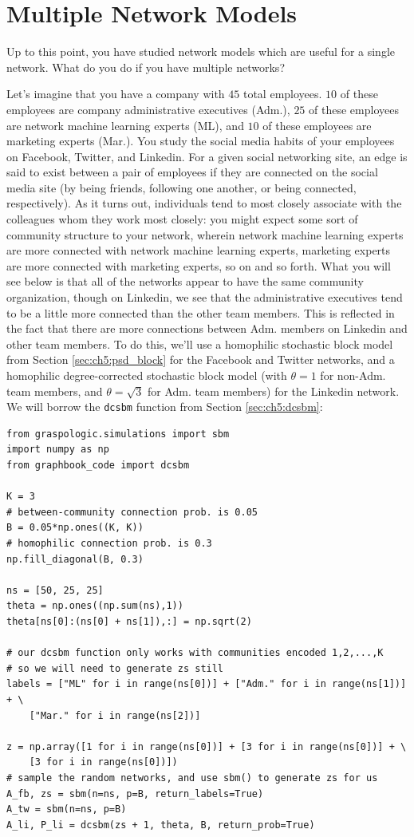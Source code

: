 \section{Multiple Network Models}
\label{sec:ch5:multi}


Up to this point, you have studied network models which are useful for a single network. What do you do if you have multiple networks?

Let's imagine that you have a company with $45$ total employees. $10$ of these employees are company administrative executives (Adm.), $25$ of these employees are network machine learning experts (ML), and $10$ of these employees are marketing experts (Mar.). You study the social media habits of your employees on Facebook, Twitter, and Linkedin. For a given social networking site, an edge is said to exist between a pair of employees if they are connected on the social media site (by being friends, following one another, or being connected, respectively). As it turns out, individuals tend to most closely associate with the colleagues whom they work most closely: you might expect some sort of community structure to your network, wherein network machine learning experts are more connected with network machine learning experts, marketing experts are more connected with marketing experts, so on and so forth. What you will see below is that all of the networks appear to have the same community organization, though on Linkedin, we see that the administrative executives tend to be a little more connected than the other team members. This is reflected in the fact that there are more connections between Adm. members on Linkedin and other team members. To do this, we'll use a homophilic stochastic block model from Section \ref{sec:ch5:psd_block} for the Facebook and Twitter networks, and a homophilic degree-corrected stochastic block model (with $\theta = 1$ for non-Adm. team members, and $\theta=\sqrt 3$ for Adm. team members) for the Linkedin network. We will borrow the \texttt{dcsbm} function from Section \ref{sec:ch5:dcsbm}:

\begin{lstlisting}[style=python]
from graspologic.simulations import sbm
import numpy as np
from graphbook_code import dcsbm

K = 3
# between-community connection prob. is 0.05
B = 0.05*np.ones((K, K))
# homophilic connection prob. is 0.3
np.fill_diagonal(B, 0.3)

ns = [50, 25, 25]
theta = np.ones((np.sum(ns),1))
theta[ns[0]:(ns[0] + ns[1]),:] = np.sqrt(2)

# our dcsbm function only works with communities encoded 1,2,...,K
# so we will need to generate zs still
labels = ["ML" for i in range(ns[0])] + ["Adm." for i in range(ns[1])] + \
    ["Mar." for i in range(ns[2])]

z = np.array([1 for i in range(ns[0])] + [3 for i in range(ns[0])] + \
    [3 for i in range(ns[0])])
# sample the random networks, and use sbm() to generate zs for us
A_fb, zs = sbm(n=ns, p=B, return_labels=True)
A_tw = sbm(n=ns, p=B)
A_li, P_li = dcsbm(zs + 1, theta, B, return_prob=True)
\end{lstlisting}


